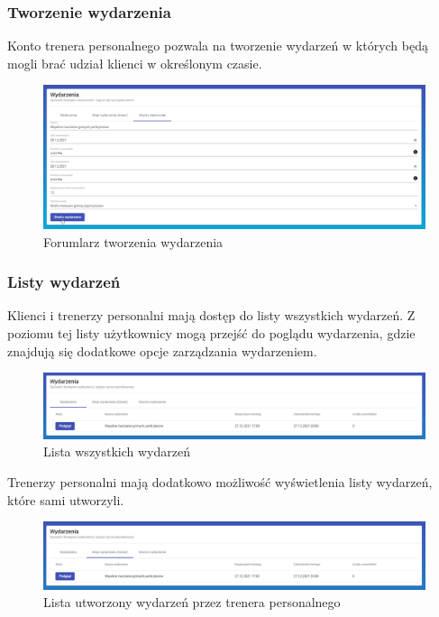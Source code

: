 \documentclass[a4paper,twoside,12pt]{book}
\begin{document}
\subsubsection{Tworzenie wydarzenia}
Konto trenera personalnego pozwala na tworzenie wydarzeń w których będą mogli brać udział klienci w określonym czasie.
\begin{figure}[H]
	\centering
	\includegraphics[width=1\linewidth]{../zrzuty_ekranu/dzialanie/wydarzenia/dodawanie_wydarzenia}
	\caption{Forumlarz tworzenia wydarzenia}
	\label{fig:dodawaniewydarzenia}
\end{figure}

\subsubsection{Listy wydarzeń}
Klienci i trenerzy personalni mają dostęp do listy wszystkich wydarzeń. Z poziomu tej listy użytkownicy mogą przejść do poglądu wydarzenia, gdzie znajdują się dodatkowe opcje zarządzania wydarzeniem.
\begin{figure}[H]
	\centering
	\includegraphics[width=1\linewidth]{../zrzuty_ekranu/dzialanie/wydarzenia/wszystkie_wydarzenia}
	\caption{Lista wszystkich wydarzeń}
	\label{fig:wszystkiewydarzenia}
\end{figure}

Trenerzy personalni mają dodatkowo możliwość wyświetlenia listy wydarzeń, które sami utworzyli.
\begin{figure}[H]
	\centering
	\includegraphics[width=1\linewidth]{../zrzuty_ekranu/dzialanie/wydarzenia/trener_lista_wydarzen}
	\caption{Lista utworzony wydarzeń przez trenera personalnego}
	\label{fig:trenerlistawydarzen}
\end{figure}
\end{document}
